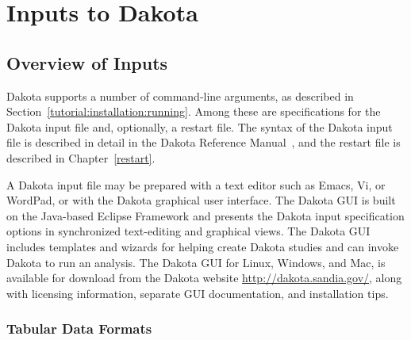 \chapter{Inputs to Dakota}\label{input}

\section{Overview of Inputs}\label{input:overview}

Dakota supports a number of command-line arguments, as described in
Section~\ref{tutorial:installation:running}.  Among these are
specifications for the Dakota input file and, optionally, a restart
file.  The syntax of the Dakota input file is described in detail in
the Dakota Reference Manual~\cite{RefMan}, and the restart file is
described in Chapter~\ref{restart}.

A Dakota input file may be prepared with a text editor such as Emacs,
Vi, or WordPad, or with the Dakota graphical user interface.
The Dakota GUI is built on the Java-based Eclipse Framework
\cite{Eclipse} and presents the Dakota input specification options in
synchronized text-editing and graphical views.  The Dakota GUI includes
templates and wizards for helping create Dakota studies and can invoke
Dakota to run an analysis.  The Dakota GUI for Linux, Windows, and
Mac, is available for download from the Dakota website
\url{http://dakota.sandia.gov/}, along with licensing information,
separate GUI documentation, and installation tips.

\subsection{Tabular Data Formats}\label{input:tabularformat}

